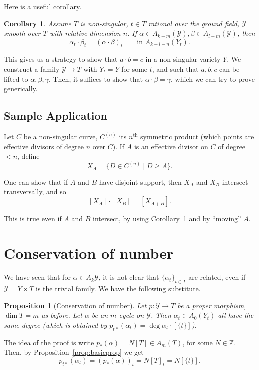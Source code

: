 \documentclass[leqno, openany]{memoir}
\newtheorem{cor}[thm]{Corollary}
\newtheorem{prop}[thm]{Proposition}
\theoremstyle{definition}
\theoremstyle{remark}
\theoremstyle{plain}
\theoremstyle{definition}
\theoremstyle{remark}
\newcommand{\Z}{\mathbb{Z}}
\newcommand{\mc}[1]{\mathcal{#1}}
\begin{document}
Here is a useful corollary.
\begin{cor}\label{cor:intfiber}
Assume $T$ is non-singular, $t \in T$ rational over the ground field, $\mc{Y}$ smooth over $T$ with relative dimension $n$. If $\alpha \in A_{k+m}(\mc{Y}), \beta \in A_{l+m}(\mc{Y})$, then 
\[ \alpha_t \cdot \beta_t = { (\alpha \cdot \beta) }_t \qquad \text{in } A_{k+l-n}(Y_t). \]
\end{cor}

This gives us a strategy to show that $a \cdot b=c$ in a non-singular variety $Y$. We construct a family $\mc{Y} \to T$ with $Y_t=Y$ for some $t$, and such that $a, b, c$ can be lifted to $\alpha, \beta, \gamma$. Then, it suffices to show that $\alpha \cdot \beta=\gamma$, which we can try to prove generically.

\subsection{Sample Application}%
\label{sub:sample_application}


Let $C$ be a non-singular curve, $C^{(n)}$ its $n^{\text{th}}$ symmetric product (which points are effective divisors of degree $n$ over $C$). If $A$ is an effective divisor on $C$ of degree $<n$, define
\[ X_A=\{D \in C^{(n)} \mid D \geq A \}. \]

One can show that if $A$ and $B$ have disjoint support, then $X_A$ and $X_B$ intersect transversally, and so
\[ [X_A] \cdot [X_B]=[X_{A+B}]. \]

This is true even if $A$ and $B$ intersect, by using Corollary~\ref{cor:intfiber} and by ``moving'' $A$. 

\section{Conservation of number}

We have seen that for $\alpha \in A_k\mc{Y}$, it is not clear that ${\{\alpha_t\}}_{t \in T}$ are related, even if $\mc{Y}=Y \times T$ is the trivial family.  We have the following substitute.

\begin{prop}[Conservation of number]
Let $p\colon \mc{Y} \to T$ be a proper morphism, $\dim T=m$ as before. Let $\alpha$ be an $m$-cycle on $\mc{Y}$. Then $\alpha_t \in A_0(Y_t)$ all have the same degree (which is obtained by $p_{t\ast}(\alpha_t)=\deg \alpha_t\cdot [\{t\}]$). 
\end{prop}

The idea of the proof is write $p_\ast(\alpha)=N[T] \in A_m(T)$, for some $N \in \Z$. Then, by Proposition~\ref{prop:basicprop} we get
\[ p_{t\ast}(\alpha_t)={ (p_\ast(\alpha)) }_t = { N[T] }_t= N[\{t\}]. \]
\end{document}
